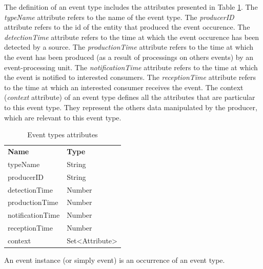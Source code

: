 The definition of an event type includes the attributes presented in Table \ref{tab:evtAttributes}. The \textit{typeName} attribute refers to the name of the event type. The \textit{producerID} attribute refers to the id of the entity that produced the event occurence. The \textit{detectionTime} attribute refers to the time at which the event occurence has been detected by a source. The \textit{productionTime} attribute refers to the time at which the event has been produced (as a result of processings on others events) by an event-processing unit. The \textit{notificationTime} attribute refers to the time at which the event is notified to interested consumers. The \textit{receptionTime} attribute refers to the time at which an interested consumer receives the event. The context (\textit{context} attribute) of an event type defines all the attributes that are particular to this event type. They represent the others data manipulated by the producer, which are relevant to this event type.
\begin{table}[h!]
\begin{center}
\begin{tabular}{ll}
\rowcolor{tcA}
\textbf{\textcolor{tcB}{Name}} & \textbf{\textcolor{tcB}{Type}}\\
typeName & String\\
producerID & String\\
detectionTime & Number\\
productionTime & Number\\
notificationTime & Number\\
receptionTime & Number\\
context & Set<Attribute>
\end{tabular}
\caption {Event types attributes}
\label{tab:evtAttributes}
\end{center}
\end{table}
 An event instance (or simply event) is an occurrence of an event type.
 
